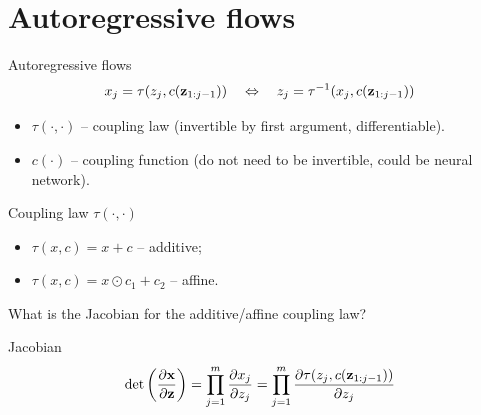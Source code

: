 \section{Autoregressive flows}
\begin{frame}{Autoregressive flows}
	\vspace{-0.3cm}
	\[
	x_j = \tau (z_j, c(\mathbf{z}_{1:j-1})) \quad \Leftrightarrow \quad z_j = \tau^{-1} (x_j, c(\mathbf{z}_{1:j-1}))
	\]
	\vspace{-0.3cm}
	\begin{itemize}
		\item $\tau (\cdot, \cdot)$ -- coupling law (invertible by first argument, differentiable).
		\item $c(\cdot)$ -- coupling function (do not need to be invertible, could be neural network).
	\end{itemize}
	\begin{block}{Coupling law $\tau(\cdot, \cdot)$}
		\begin{itemize}
			\item $\tau(x, c) = x + c$ -- additive;
			\item $\tau(x, c) = x \odot c_1 + c_2$ -- affine.
		\end{itemize}
	\end{block}
	What is the Jacobian for the additive/affine coupling law? 
	\begin{block}{Jacobian}
		\vspace{-0.3cm}
		\[
		\det \left( \frac{\partial \mathbf{x}}{\partial \mathbf{z}} \right) = \prod_{j=1}^m \frac{\partial x_j}{\partial z_j} = \prod_{j=1}^m \frac{\partial \tau (z_j, c(\mathbf{z}_{1:j-1})) }{\partial z_j}
		\]
		\vspace{-0.3cm}
	\end{block}
	
\end{frame}
